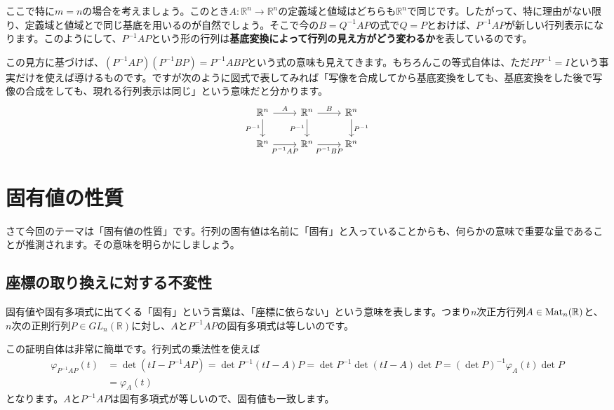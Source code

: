 ここで特に$m = n$の場合を考えましょう。このとき$A \colon \mathbb{R}^n \rightarrow \mathbb{R}^n$の定義域と値域はどちらも$\mathbb{R}^n$で同じです。したがって、特に理由がない限り、定義域と値域とで同じ基底を用いるのが自然でしょう。そこで今の$B = Q^{-1} A P$の式で$Q = P$とおけば、$P^{-1} A P$が新しい行列表示になります。このようにして、$P^{-1} A P$という形の行列は\textbf{基底変換によって行列の見え方がどう変わるか}を表しているのです。

この見方に基づけば、$(P^{-1} A P)(P^{-1} B P) = P^{-1} AB P$という式の意味も見えてきます。もちろんこの等式自体は、ただ$P P^{-1} = I$という事実だけを使えば導けるものです。ですが次のように図式で表してみれば「写像を合成してから基底変換をしても、基底変換をした後で写像の合成をしても、現れる行列表示は同じ」という意味だと分かります。
\[
\begin{tikzcd}
\mathbb{R}^n \arrow{r}{A} \arrow{d}[swap]{P^{-1}} & \mathbb{R}^n \arrow{d}[swap]{P^{-1}}  \arrow{r}{B} & \mathbb{R}^n \ar{d}{P^{-1}} \\
\mathbb{R}^n \arrow{r}[swap]{P^{-1} A P} & \mathbb{R}^n \arrow{r}[swap]{P^{-1} B P} & \mathbb{R}^n
\end{tikzcd}
\]

\section{固有値の性質}

さて今回のテーマは「固有値の性質」です。行列の固有値は名前に「固有」と入っていることからも、何らかの意味で重要な量であることが推測されます。その意味を明らかにしましょう。

\subsection{座標の取り換えに対する不変性}

固有値や固有多項式に出てくる「固有」という言葉は、「座標に依らない」という意味を表します。つまり$n$次正方行列$A \in \operatorname{Mat}_n(\mathbb{R})$と、$n$次の正則行列$P \in GL_n(\mathbb{R})$に対し、$A$と$P^{-1} A P$の固有多項式は等しいのです。

この証明自体は非常に簡単です。行列式の乗法性を使えば
\begin{align*}
\varphi_{P^{-1} A P}(t)
&= \det(tI - P^{-1} A P) = \det P^{-1} (tI - A) P = \det P^{-1} \det (tI - A) \det P = (\det P)^{-1} \varphi_A(t) \det P \\
&= \varphi_A(t)
\end{align*}
となります。$A$と$P^{-1} A P$は固有多項式が等しいので、固有値も一致します。

